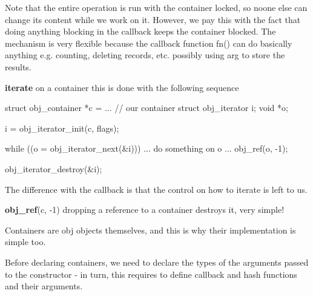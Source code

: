 Note that the entire operation is run with the container locked, so noone else can change its content while we work on it. However, we pay this with the fact that doing anything blocking in the callback keeps the container blocked. The mechanism is very flexible because the callback function fn() can do basically anything e.g. counting, deleting records, etc. possibly using arg to store the results.


\begin{DoxyItemize}
\item {\bfseries iterate} on a container this is done with the following sequence
\end{DoxyItemize}


\begin{DoxyCode}
            struct obj_container *c = ... // our container
            struct obj_iterator i;
            void *o;

            i = obj_iterator_init(c, flags);

            while ((o = obj_iterator_next(&i))) {
                ... do something on o ...
                obj_ref(o, -1);
            }

            obj_iterator_destroy(&i);
\end{DoxyCode}


The difference with the callback is that the control on how to iterate is left to us.


\begin{DoxyItemize}
\item {\bfseries obj\_\-ref}(c, -\/1) dropping a reference to a container destroys it, very simple!
\end{DoxyItemize}

Containers are obj objects themselves, and this is why their implementation is simple too.

Before declaring containers, we need to declare the types of the arguments passed to the constructor -\/ in turn, this requires to define callback and hash functions and their arguments. 